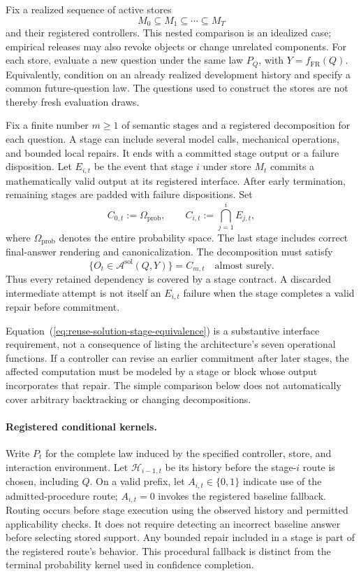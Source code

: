 \documentclass[10pt]{article} %
\renewcommand{\eqref}[1]{\textup{(\ref{#1})}}
\providecommand{\1}{\mathbf{1}}  %
\theoremstyle{remark}
\theoremstyle{definition}
\begin{document}
Fix a realized sequence of active stores
\[
M_0\subseteq M_1\subseteq\cdots\subseteq M_T
\]
and their registered controllers. This nested comparison is an idealized
case; empirical releases may also revoke objects or change unrelated
components. For each store, evaluate a new question under the same law
$P_Q$, with $Y=f_{\mathrm{FR}}(Q)$. Equivalently, condition on an already
realized development history and specify a common future-question law.
The questions used to construct the stores are not thereby fresh
evaluation draws.

Fix a finite number $m\geq1$ of semantic stages and a registered
decomposition for each question. A stage can include several model calls,
mechanical operations, and bounded local repairs. It ends with a committed
stage output or a failure disposition. Let $E_{i,t}$ be the event that
stage $i$ under store $M_t$ commits a mathematically valid output at its
registered interface. After early termination, remaining stages are
padded with failure dispositions. Set
\[
C_{0,t}:=\Omega_{\mathrm{prob}},
\qquad
C_{i,t}:=\bigcap_{j=1}^{i}E_{j,t},
\]
where $\Omega_{\mathrm{prob}}$ denotes the entire probability space.
The last stage includes correct final-answer rendering and
canonicalization. The decomposition must satisfy
\begin{equation}
\{O_t\in\mathcal A^{\mathrm{sol}}(Q,Y)\}=C_{m,t}
\quad\text{almost surely}.
\label{eq:reuse-solution-stage-equivalence}
\end{equation}
Thus every retained dependency is covered by a stage contract. A
discarded intermediate attempt is not itself an $E_{i,t}$ failure when
the stage completes a valid repair before commitment.

Equation~\eqref{eq:reuse-solution-stage-equivalence} is a substantive
interface requirement, not a consequence of listing the architecture's
seven operational functions. If a controller can revise an earlier
commitment after later stages, the affected computation must be modeled
by a stage or block whose output incorporates that repair. The simple
comparison below does not automatically cover arbitrary backtracking or
changing decompositions.

\paragraph{Registered conditional kernels.}

Write $P_t$ for the complete law induced by the specified controller,
store, and interaction environment. Let $\mathcal H_{i-1,t}$ be its
history before the stage-$i$ route is chosen, including $Q$. On a valid
prefix, let $A_{i,t}\in\{0,1\}$ indicate use of the admitted-procedure
route; $A_{i,t}=0$ invokes the registered baseline fallback. Routing
occurs before stage execution using the observed history and permitted
applicability checks. It does not require detecting an incorrect
baseline answer before selecting stored support. Any bounded repair
included in a stage is part of the registered route's behavior.
This procedural fallback is distinct from the terminal probability
kernel used in confidence completion.
\end{document}
